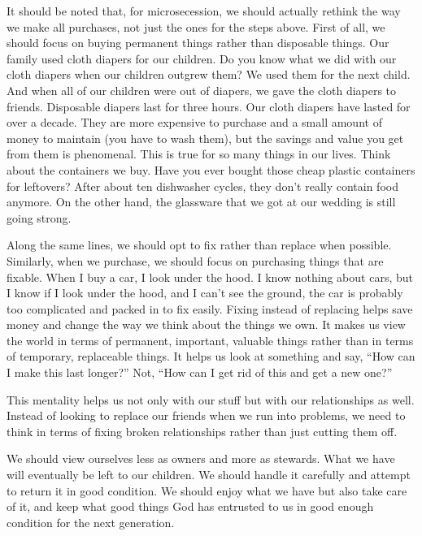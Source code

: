 \begin{infonote}

It should be noted that, for microsecession, we should actually rethink
the way we make all purchases, not just the ones for the steps above.
First of all, we should focus on buying permanent things rather than
disposable things. Our family used cloth diapers for our children. Do
you know what we did with our cloth diapers when our children outgrew
them?  We used them for the next child. And when all of our children
were out of diapers, we gave the cloth diapers to friends.
Disposable diapers
last for three hours. Our cloth diapers have lasted for over a decade.
They are more expensive to purchase and a small amount of money to
maintain (you have to wash them), but the savings and value you get
from them is phenomenal. This is true for so many things in our lives.
Think about the containers we buy. Have you ever bought those cheap
plastic containers for leftovers?  After about ten dishwasher cycles,
they don't really contain food anymore. On the other
hand, the glassware that we got at our wedding is still going strong. 

Along the same lines, we should opt to fix rather than replace when
possible. Similarly, when we purchase, we should focus on purchasing
things that are fixable. When I buy a car, I look under the hood. I
know nothing about cars, but I know if I look under the hood, and I
can't see the ground, the car is probably too
complicated and packed in to fix easily. Fixing instead of replacing
helps save money and
change the way we think about the things we own. It makes us view the
world in terms of permanent, important, valuable things rather than in
terms of temporary, replaceable things. It helps us look at
something and say,
“How can I make this last longer?” Not, “How can I get rid of this and
get a new one?”  

This mentality helps us not only with our
stuff but
with our
relationships as well. Instead of looking to replace our friends when
we run into problems,
we need to think in
terms of fixing broken relationships rather than just cutting them
off.

We should view ourselves less as owners and more as stewards. What we
have will eventually be left to our children. We should handle it
carefully and attempt to return it in good condition. We should enjoy
what we have but also take care of it, and keep what good things God
has entrusted to us in good enough condition for the next generation.


\end{infonote}
